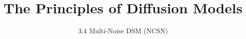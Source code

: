
\title{The Principles of Diffusion Models}
\subtitle{3.4 Multi-Noise DSM (NCSN)}


\begin{frame}
    \titlepage
\end{frame}



